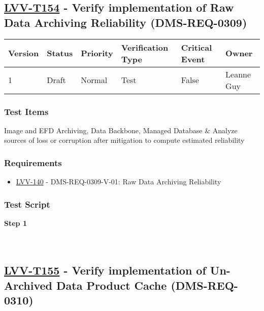 \hypertarget{lvv-t154---verify-implementation-of-raw-data-archiving-reliability-dms-req-0309}{%
\subsection{\texorpdfstring{\href{https://jira.lsstcorp.org/secure/Tests.jspa\#/testCase/LVV-T154}{LVV-T154}
- Verify implementation of Raw Data Archiving Reliability
(DMS-REQ-0309)}{LVV-T154 - Verify implementation of Raw Data Archiving Reliability (DMS-REQ-0309)}}\label{lvv-t154---verify-implementation-of-raw-data-archiving-reliability-dms-req-0309}}

\begin{longtable}[]{@{}llllll@{}}
\toprule
Version & Status & Priority & Verification Type & Critical Event &
Owner\tabularnewline
\midrule
\endhead
1 & Draft & Normal & Test & False & Leanne Guy\tabularnewline
\bottomrule
\end{longtable}

\hypertarget{test-items-130}{%
\subsubsection{Test Items}\label{test-items-130}}

Image and EFD Archiving, Data Backbone, Managed Database \& Analyze
sources of loss or corruption after mitigation to compute estimated
reliability

\hypertarget{requirements-131}{%
\subsubsection{Requirements}\label{requirements-131}}

\begin{itemize}
\tightlist
\item
  \href{https://jira.lsstcorp.org/browse/LVV-140}{LVV-140} -
  DMS-REQ-0309-V-01: Raw Data Archiving Reliability
\end{itemize}

\hypertarget{test-script-131}{%
\subsubsection{Test Script}\label{test-script-131}}

\textbf{Step 1}\\
~\\
~\\

\hypertarget{lvv-t155---verify-implementation-of-un-archived-data-product-cache-dms-req-0310}{%
\subsection{\texorpdfstring{\href{https://jira.lsstcorp.org/secure/Tests.jspa\#/testCase/LVV-T155}{LVV-T155}
- Verify implementation of Un-Archived Data Product Cache
(DMS-REQ-0310)}{LVV-T155 - Verify implementation of Un-Archived Data Product Cache (DMS-REQ-0310)}}\label{lvv-t155---verify-implementation-of-un-archived-data-product-cache-dms-req-0310}}

